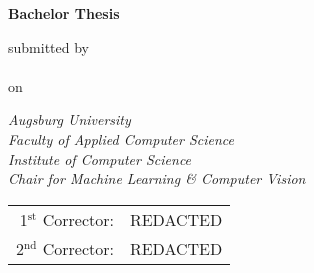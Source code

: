 

\newcommand{\mail}{REDACTED}



\begin{titlepage}
    
\color{dblue}

\begin{center}
    \vspace*{2cm}
    \Huge
    \textbf{\thetitle}

    \vspace*{1.5cm}
    \color{black}
    \textbf{Bachelor Thesis}

    \vspace*{1cm}
    \normalsize
    submitted by\\
    \LARGE
    \theauthor\\\vspace*{0.3cm}
    \normalsize
    on \thedate

    \vspace{1.8cm}
    \color{black}
    \emph{Augsburg University}\\
    \emph{Faculty of Applied Computer Science}\\
    \emph{Institute of Computer Science}\\
    \emph{Chair for Machine Learning \& Computer Vision}

    \vfill

    \begin{tabular}{rl}
        1$^\text{st}$ Corrector: &REDACTED\\
        2$^\text{nd}$ Corrector: &REDACTED\\
    \end{tabular}
\end{center}

\end{titlepage}
